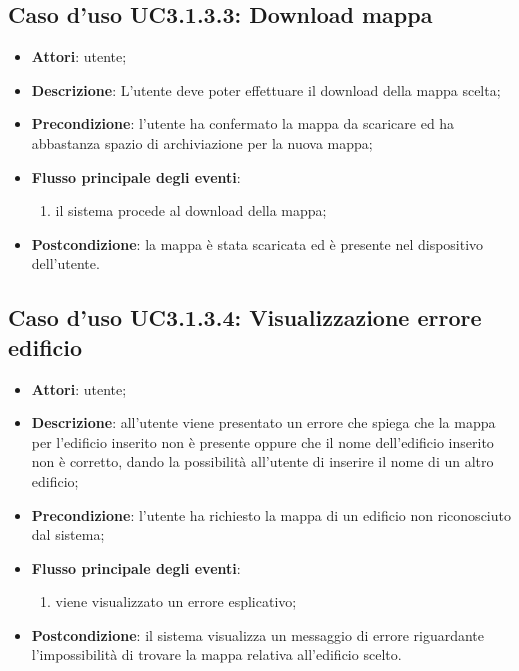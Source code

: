 \documentclass[../AnalisiDeiRequisiti.tex]{subfiles}
\begin{document}
\subsection{Caso d'uso UC3.1.3.3: Download mappa}
\begin{itemize}
\item \textbf{Attori}: utente;
\item \textbf{Descrizione}: L'utente deve poter effettuare il download della mappa scelta; 
      \item \textbf{Precondizione}: l'utente ha confermato la mappa da scaricare ed ha abbastanza spazio di archiviazione per la nuova mappa;

        \item \textbf{Flusso principale degli eventi}:
          \begin{enumerate}
          \item il sistema procede al download della mappa;

      \end{enumerate}
    \item \textbf{Postcondizione}: la mappa è stata scaricata ed è presente nel dispositivo dell'utente.
  \end{itemize}
\hypertarget{UC3.1.3.4}{}
\subsection{Caso d'uso UC3.1.3.4: Visualizzazione errore edificio}
\begin{itemize}
\item \textbf{Attori}: utente;
\item \textbf{Descrizione}: all'utente viene presentato un errore che spiega che la mappa per l'edificio inserito non è presente oppure che il nome dell'edificio inserito non è corretto, dando la possibilità all'utente di inserire il nome di un altro edificio; 
      \item \textbf{Precondizione}: l'utente ha richiesto la mappa di un edificio non riconosciuto dal sistema;

        \item \textbf{Flusso principale degli eventi}:
          \begin{enumerate}
          \item viene visualizzato un errore esplicativo;

      \end{enumerate}
    \item \textbf{Postcondizione}: il sistema visualizza un messaggio di errore riguardante l'impossibilità di trovare la mappa relativa all'edificio scelto.
  \end{itemize}
\hypertarget{UC3.2}{}
\end{document}
